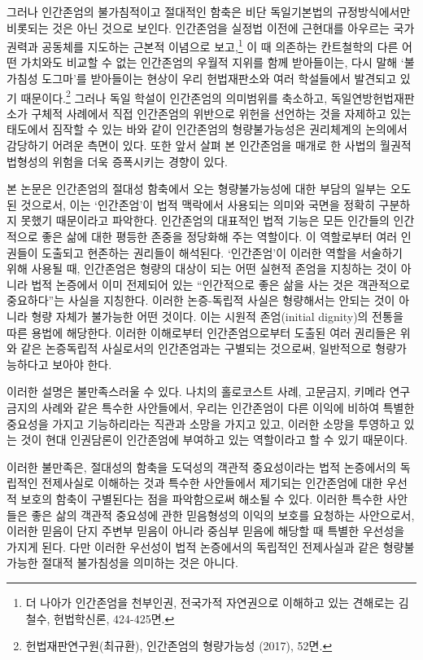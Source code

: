 그러나 인간존엄의 불가침적이고 절대적인 함축은 비단 독일기본법의 규정방식에서만 비롯되는 것은 아닌 것으로 보인다. 인간존엄을 실정법 이전에 근현대를 아우르는 국가권력과 공동체를 지도하는 근본적 이념으로 보고,\footnote{더 나아가 인간존엄을 천부인권, 전국가적 자연권으로 이해하고 있는 견해로는 김철수, 헌법학신론, 424-425면.} 이 때 의존하는 칸트철학의 다른 어떤 가치와도 비교할 수 없는 인간존엄의 우월적 지위를 함께 받아들이는, 다시 말해 `불가침성 도그마'를 받아들이는 현상이 우리 헌법재판소와 여러 학설들에서 발견되고 있기 때문이다.\footnote{헌법재판연구원(최규환), 인간존엄의 형량가능성 (2017), 52면.} 그러나 독일 학설이 인간존엄의 의미범위를 축소하고, 독일연방헌법재판소가 구체적 사례에서 직접 인간존엄의 위반으로 위헌을 선언하는 것을 자제하고 있는 태도에서 짐작할 수 있는 바와 같이 인간존엄의 형량불가능성은 권리체계의 논의에서 감당하기 어려운 측면이 있다. 또한 앞서 살펴 본 인간존엄을 매개로 한 사법의 월권적 법형성의 위험을 더욱 증폭시키는 경향이 있다.

본 논문은 인간존엄의 절대성 함축에서 오는 형량불가능성에 대한 부담의 일부는 오도된 것으로서, 이는 `인간존엄'이 법적 맥락에서 사용되는 의미와 국면을 정확히 구분하지 못했기 때문이라고 파악한다. 인간존엄의 대표적인 법적 기능은 모든 인간들의 인간적으로 좋은 삶에 대한 평등한 존중을 정당화해 주는 역할이다. 이 역할로부터 여러 인권들이 도출되고 현존하는 권리들이 해석된다. `인간존엄'이 이러한 역할을 서술하기 위해 사용될 때, 인간존엄은 형량의 대상이 되는 어떤 실현적 존엄을 지칭하는 것이 아니라 법적 논증에서 이미 전제되어 있는 ``인간적으로 좋은 삶을 사는 것은 객관적으로 중요하다''는 사실을 지칭한다. 이러한 논증-독립적 사실은 형량해서는 안되는 것이 아니라 형량 자체가 불가능한 어떤 것이다. 이는 시원적 존엄(initial dignity)의 전통을 따른 용법에 해당한다. 이러한 이해로부터 인간존엄으로부터 도출된 여러 권리들은 위와 같은 논증독립적 사실로서의 인간존엄과는 구별되는 것으로써, 일반적으로 형량가능하다고 보아야 한다.

이러한 설명은 불만족스러울 수 있다. 나치의 홀로코스트 사례, 고문금지, 키메라 연구 금지의 사례와 같은 특수한 사안들에서, 우리는 인간존엄이 다른 이익에 비하여 특별한 중요성을 가지고 기능하리라는 직관과 소망을 가지고 있고, 이러한 소망을 투영하고 있는 것이 현대 인권담론이 인간존엄에 부여하고 있는 역할이라고 할 수 있기 때문이다.

이러한 불만족은, 절대성의 함축을 도덕성의 객관적 중요성이라는 법적 논증에서의 독립적인 전제사실로 이해하는 것과 특수한 사안들에서 제기되는 인간존엄에 대한 우선적 보호의 함축이 구별된다는 점을 파악함으로써 해소될 수 있다. 이러한 특수한 사안들은 좋은 삶의 객관적 중요성에 관한 믿음형성의 이익의 보호를 요청하는 사안으로서, 이러한 믿음이 단지 주변부 믿음이 아니라 중심부 믿음에 해당할 때 특별한 우선성을 가지게 된다. 다만 이러한 우선성이 법적 논증에서의 독립적인 전제사실과 같은 형량불가능한 절대적 불가침성을 의미하는 것은 아니다.

